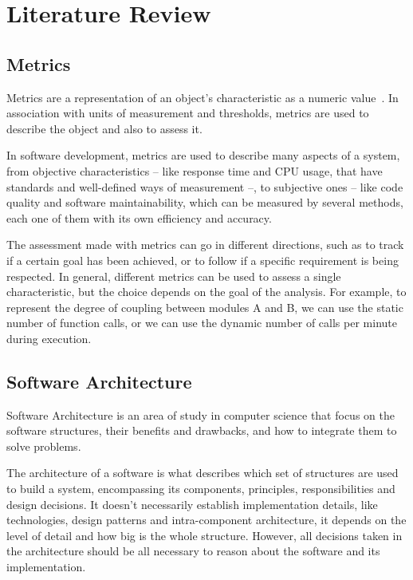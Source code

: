 

\chapter{Literature Review}
\label{cap:literature}

\enlargethispage{.5\baselineskip}

\section{Metrics}
\label{sec:metrics}
Metrics are a representation of an object’s characteristic as a numeric value~\cite{OOMetrics}. In association with units of measurement and thresholds, metrics are used to describe the object and also to assess it.

In software development, metrics are used to describe many aspects of a system, from objective characteristics – like response time and CPU usage, that have standards and well-defined ways of measurement –, to subjective ones – like code quality and software maintainability, which can be measured by several methods, each one of them with its own efficiency and accuracy.

The assessment made with metrics can go in different directions, such as to track if a certain goal has been achieved, or to follow if a specific requirement is being respected. In general, different metrics can be used to assess a single characteristic, but the choice depends on the goal of the analysis. For example, to represent the degree of coupling between modules A and B, we can use the static number of function calls, or we can use the dynamic number of calls per minute during execution.

\section{Software Architecture}
\label{sec:softarq}
Software Architecture is an area of study in computer science that focus on the software structures, their benefits and drawbacks, and how to integrate them to solve problems.

The architecture of a software is what describes which set of structures are used to build a system, encompassing its components, principles, responsibilities and design decisions. It doesn't necessarily establish implementation details, like technologies, design patterns and intra-component architecture, it depends on the level of detail and how big is the whole structure. However, all decisions taken in the architecture should be all necessary to reason about the software and its implementation.

